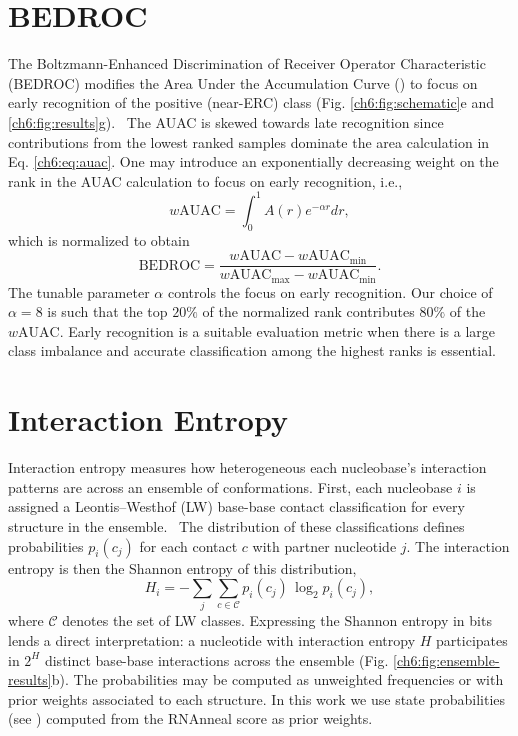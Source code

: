\section{BEDROC}
       {}
\label{ch6:methods:bedroc}

The Boltzmann-Enhanced Discrimination of Receiver Operator Characteristic (BEDROC) modifies the Area Under the Accumulation Curve () to focus on early recognition of the positive (near-ERC) class (Fig. \ref{ch6:fig:schematic}e and \ref{ch6:fig:results}g).~\cite{truchon2007bedroc} The AUAC is skewed towards late recognition since contributions from the lowest ranked samples dominate the area calculation in Eq. \ref{ch6:eq:auac}. One may introduce an exponentially decreasing weight on the rank in the AUAC calculation to focus on early recognition, i.e.,
\begin{equation}
    \label{ch6:eq:wauac}
    w\mathrm{AUAC} = \int_0^1 A(r)e^{-\alpha r}dr,
\end{equation}
which is normalized to obtain
\begin{equation}
    \label{ch6:eq:bedroc}
    \mathrm{BEDROC} = \frac{w\mathrm{AUAC} - w\mathrm{AUAC}_{\mathrm{min}}}{w\mathrm{AUAC}_{\mathrm{max}} - w\mathrm{AUAC}_{\mathrm{min}}}.
\end{equation}
The tunable parameter $\alpha$ controls the focus on early recognition. Our choice of $\alpha=8$ is such that the top $20\%$ of the normalized rank contributes $80\%$ of the $w\mathrm{AUAC}$. Early recognition is a suitable evaluation metric when there is a large class imbalance and accurate classification among the highest ranks is essential.

\section{Interaction Entropy}
       {}
\label{ch6:methods:interaction-entropy}
Interaction entropy measures how heterogeneous each nucleobase’s interaction patterns are across an ensemble of conformations. First, each nucleobase $i$ is assigned a Leontis--Westhof (LW) base-base contact classification for every structure in the ensemble.~\cite{leontis2001geometric} The distribution of these classifications defines probabilities $p_i(c_j)$ for each contact $c$ with partner nucleotide $j$. The interaction entropy is then the Shannon entropy of this distribution,
\[
H_i = -\sum_j \sum_{c \in \mathcal{C}} p_i(c_j) \,\log_2 p_i(c_j),
\]
where $\mathcal{C}$ denotes the set of LW classes. Expressing the Shannon entropy in bits lends a direct interpretation: a nucleotide with interaction entropy $H$ participates in $2^{H}$ distinct base-base interactions across the ensemble (Fig. \ref{ch6:fig:ensemble-results}b). The probabilities may be computed as unweighted frequencies or with prior weights associated to each structure. In this work we use state probabilities (see ) computed from the RNAnneal score as prior weights.

